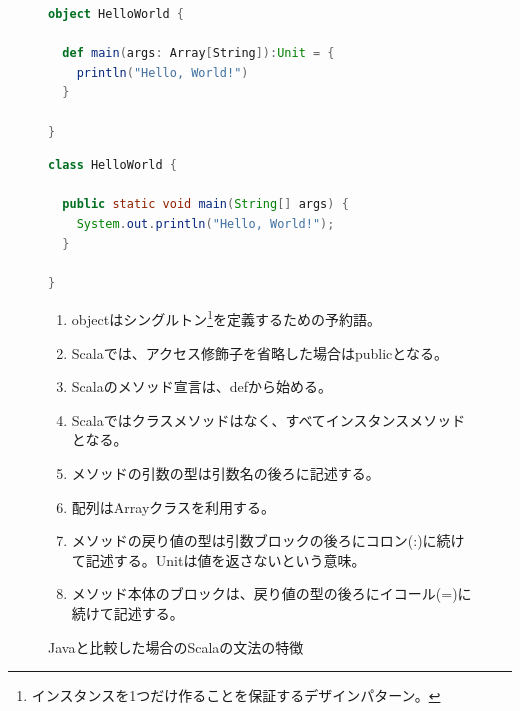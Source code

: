 \begin{figure}[h]
  \caption{Javaと比較した場合のScalaの文法の特徴}
  \label{fig:java_vs_scala_helloworld}

\begin{minipage}[t]{0.5\textwidth}
\begin{lstlisting}[language=scala]
object HelloWorld {

  def main(args: Array[String]):Unit = {
    println("Hello, World!")
  }

}
\end{lstlisting}%
\end{minipage}%
\hfill
\begin{minipage}[t]{0.5\textwidth}
\begin{lstlisting}[language=java]
class HelloWorld {

  public static void main(String[] args) {
    System.out.println("Hello, World!");
  }

}
\end{lstlisting}%
\end{minipage}%

\begin{screen}
\begin{enumerate}
\item objectはシングルトン\footnote{インスタンスを1つだけ作ることを保証するデザインパターン。}を定義するための予約語。
\item Scalaでは、アクセス修飾子を省略した場合はpublicとなる。
\item Scalaのメソッド宣言は、defから始める。
\item Scalaではクラスメソッドはなく、すべてインスタンスメソッドとなる。
\item メソッドの引数の型は引数名の後ろに記述する。
\item 配列はArrayクラスを利用する。
\item メソッドの戻り値の型は引数ブロックの後ろにコロン(:)に続けて記述する。Unitは値を返さないという意味。
\item メソッド本体のブロックは、戻り値の型の後ろにイコール(=)に続けて記述する。
\end{enumerate}
\end{screen}

\end{figure}
